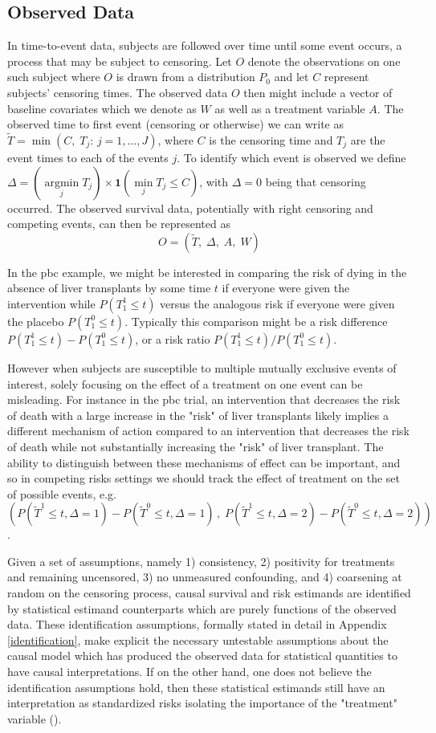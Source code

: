 \documentclass{report}
\DeclareMathOperator*{\argmin}{argmin}
\newcommand{\1}{\ensuremath{\mathbf{1}}}
\newcommand{\T}{\ensuremath{\widetilde{T}}}
\renewcommand{\L}{\ensuremath{W}}
\begin{document}
\subsection{Observed Data}
\label{ObservedData}
In time-to-event data, subjects are followed over time until some event occurs, a process that may be subject to censoring. Let \(O\) denote the observations on one such subject where \(O\) is drawn from a distribution \(P_0\) and let \(C\) represent subjects' censoring times. The observed data \(O\) then might include a vector of baseline covariates which we denote as \(\L\) as well as a treatment variable \(A\). The observed time to first event (censoring or otherwise) we can write as \(\T = \min(C,\; T_j :\, j = 1, \dots, J)\), where \(C\) is the censoring time and \(T_j\) are the event times to each of the events \(j\). To identify which event is observed we define \(\Delta = (\argmin\limits_j T_j) \times \1(\min\limits_j T_j \leq C)\), with \(\Delta = 0\) being that censoring occurred. The observed survival data, potentially with right censoring and competing events, can then be represented as 
\[O = (\T,\;\Delta,\;A,\;\L)\]

In the pbc example, we might be interested in comparing the risk of dying in the absence of liver transplants by some time \(t\) if everyone were given the intervention while  \(P(T^1_1 \leq t)\) versus the analogous risk if everyone were given the placebo \(P(T^0_1 \leq t)\). Typically this comparison might be a risk difference \(P(T^1_1 \leq t) - P(T^0_1 \leq t)\), or a risk ratio \(P(T^1_1 \leq t) / P(T^0_1 \leq t)\).

However when subjects are susceptible to multiple mutually exclusive events of interest, solely focusing on the effect of a treatment on one event can be misleading. For instance in the pbc trial, an intervention that decreases the risk of death with a large increase in the "risk" of liver transplants likely implies a different mechanism of action compared to an intervention that decreases the risk of death while not substantially increasing the "risk" of liver transplant. The ability to distinguish between these mechanisms of effect can be important, and so in competing risks settings we should track the effect of treatment on the set of possible events, e.g. \(\left(P(\T^1 \leq t, \Delta = 1) - P(\T^0 \leq t, \Delta = 1)\,,\;P(\T^1 \leq t, \Delta = 2) - P(\T^0 \leq t, \Delta = 2)\right)\).

Given a set of assumptions, namely 1) consistency, 2) positivity for treatments and remaining uncensored, 3) no unmeasured confounding, and 4) coarsening at random on the censoring process, causal survival and risk estimands are identified by statistical estimand counterparts which are purely functions of the observed data. These identification assumptions, formally stated in detail in Appendix \ref{identification}, make explicit the necessary untestable assumptions about the causal model which has produced the observed data for statistical quantities to have causal interpretations. If on the other hand, one does not believe the identification assumptions hold, then these statistical estimands still have an interpretation as standardized risks isolating the importance of the "treatment" variable (\cite{laan_statistical_2006}).  
\end{document}
